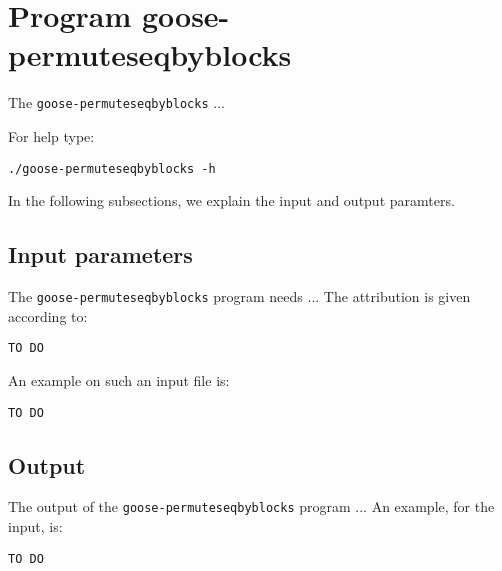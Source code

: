 \section{Program goose-permuteseqbyblocks}
The \texttt{goose-permuteseqbyblocks} ...

For help type:
\begin{lstlisting}
./goose-permuteseqbyblocks -h
\end{lstlisting}
In the following subsections, we explain the input and output paramters.

\subsection*{Input parameters}

The \texttt{goose-permuteseqbyblocks} program needs ...
The attribution is given according to:
\begin{lstlisting}
TO DO
\end{lstlisting}

An example on such an input file is:
\begin{lstlisting}
TO DO
\end{lstlisting}

\subsection*{Output}
The output of the \texttt{goose-permuteseqbyblocks} program ...
An example, for the input, is:
\begin{lstlisting}
TO DO
\end{lstlisting}
